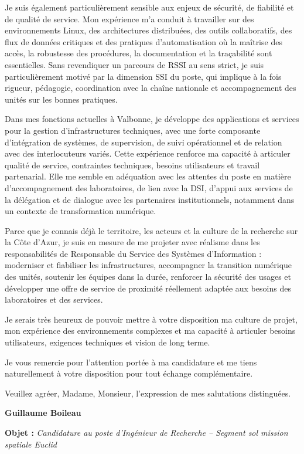 \documentclass[11pt,a4paper]{altacv}
\begin{document}
{Je suis également particulièrement sensible aux enjeux de sécurité, de fiabilité et de qualité de service. Mon expérience m’a conduit à travailler sur des environnements Linux, des architectures distribuées, des outils collaboratifs, des flux de données critiques et des pratiques d’automatisation où la maîtrise des accès, la robustesse des procédures, la documentation et la traçabilité sont essentielles. Sans revendiquer un parcours de RSSI au sens strict, je suis particulièrement motivé par la dimension SSI du poste, qui implique à la fois rigueur, pédagogie, coordination avec la chaîne nationale et accompagnement des unités sur les bonnes pratiques.

Dans mes fonctions actuelles à Valbonne, je développe des applications et services pour la gestion d’infrastructures techniques, avec une forte composante d’intégration de systèmes, de supervision, de suivi opérationnel et de relation avec des interlocuteurs variés. Cette expérience renforce ma capacité à articuler qualité de service, contraintes techniques, besoins utilisateurs et travail partenarial. Elle me semble en adéquation avec les attentes du poste en matière d’accompagnement des laboratoires, de lien avec la DSI, d’appui aux services de la délégation et de dialogue avec les partenaires institutionnels, notamment dans un contexte de transformation numérique.

Parce que je connais déjà le territoire, les acteurs et la culture de la recherche sur la Côte d’Azur, je suis en mesure de me projeter avec réalisme dans les responsabilités de Responsable du Service des Systèmes d’Information : moderniser et fiabiliser les infrastructures, accompagner la transition numérique des unités, soutenir les équipes dans la durée, renforcer la sécurité des usages et développer une offre de service de proximité réellement adaptée aux besoins des laboratoires et des services.

Je serais très heureux de pouvoir mettre à votre disposition ma culture de projet, mon expérience des environnements complexes et ma capacité à articuler besoins utilisateurs, exigences techniques et vision de long terme.

Je vous remercie pour l'attention portée à ma candidature et me tiens naturellement à votre disposition pour tout échange complémentaire.

Veuillez agréer, Madame, Monsieur, l'expression de mes salutations distinguées.

\textbf{Guillaume Boileau}

\fi
\iffalse
{\color{accent}\textbf{Objet :}} \textit{Candidature au poste d'Ingénieur de Recherche -- Segment sol mission spatiale Euclid}

}
\end{document}

